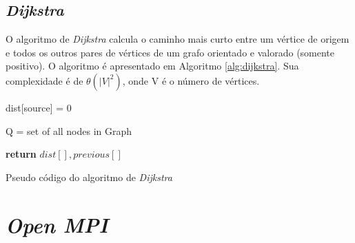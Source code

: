 \documentclass[11pt,twoside]{article}
\begin{document}
    \subsection{{\it Dijkstra}}
    
        O algoritmo de {\it Dijkstra} calcula o caminho mais curto entre um vértice de origem e
        todos os outros pares de vértices de um grafo orientado e valorado (somente positivo).
        O algoritmo é apresentado em Algoritmo \ref{alg:dijkstra}. Sua complexidade é de 
        $\theta(|V|^2)$\cite{cormen2001}, onde V é o número de vértices.

        \begin{algorithm}[ht]
            
            dist[source] = 0\;
            
            Q = set of all nodes in Graph\;
            
            \textbf{return} $dist[], previous[]$\;
            
            \caption{Pseudo código do algoritmo de {\it Dijkstra}}
            \label{alg:dijkstra}
        \end{algorithm}

\section{{\it Open MPI}}
    
\end{document}
